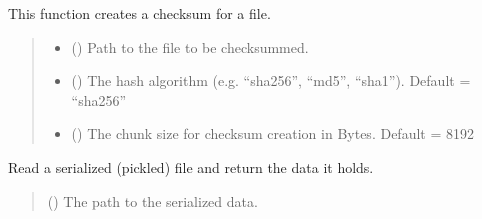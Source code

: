 \documentclass[letterpaper,10pt,english]{sphinxmanual}
\begin{document}
\begin{fulllineitems}
\label{\detokenize{generated/bp_text.utilities:bp_text.utilities.file_checksum}}
\pysigstartsignatures
\pysiglinewithargsret
{}
{\sphinxparamcomma {}\sphinxparamcomma {}}
{}
\pysigstopsignatures
\sphinxAtStartPar
This function creates a checksum for a file.
\begin{quote}\begin{description}
\begin{itemize}
\item {} 
\sphinxAtStartPar
{} () \textendash{} Path to the file to be checksummed.

\item {} 
\sphinxAtStartPar
{} () \textendash{} The hash algorithm (e.g. “sha256”, “md5”, “sha1”).
Default = “sha256”

\item {} 
\sphinxAtStartPar
{} () \textendash{} The chunk size for checksum creation in Bytes.
Default = 8192

\end{itemize}

\end{description}\end{quote}

\end{fulllineitems}


\begin{fulllineitems}
\label{\detokenize{generated/bp_text.utilities:bp_text.utilities.read_pickle}}
\pysigstartsignatures
\pysiglinewithargsret
{}
{}
{}
\pysigstopsignatures
\sphinxAtStartPar
Read a serialized (pickled) file and return the data it holds.
\begin{quote}\begin{description}
\sphinxAtStartPar
{} () \textendash{} The path to the serialized data.

\end{description}\end{quote}

\end{fulllineitems}
\end{document}
